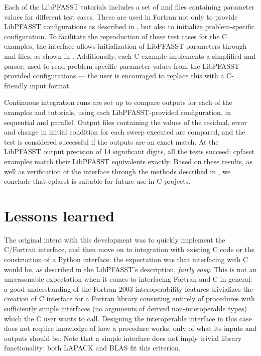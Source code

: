 Each of the LibPFASST tutorials includes a set of nml files containing parameter values for different test cases. These are used in Fortran not only to provide LibPFASST configurations as described in , but also to initialize problem-specific configuration. To facilitate the reproduction of these test cases for the C examples, the interface allows initialization of LibPFASST parameters through nml files, as shown in . Additionally, each C example implements a simplified nml parser, used to read problem-specific parameter values from the LibPFASST-provided configurations --- the user is encouraged to replace this with a C-friendly input format.

Continuous integration runs are set up to compare outputs for each of the examples and tutorials, using each LibPFASST-provided configuration, in sequential and parallel. Output files containing the values of the residual, error and change in initial condition for each sweep executed are compared, and the test is considered successful if the outputs are an exact match. At the LibPFASST output precision of 14 significant digits, all the tests succeed: cpfasst examples match their LibPFASST equivalents exactly. Based on these results, as well as verification of the interface through the methods described in , we conclude that cpfasst is suitable for future use in C projects. 

\section{Lessons learned}

The original intent with this development was to quickly implement the C/Fortran interface, and then move on to integration with existing C code or the construction of a Python interface: the expectation was that interfacing with C would be, as described in the LibPFASST's description, \textit{fairly easy}. This is not an unreasonable expectation when it comes to interfacing Fortran and C in general: a good understanding of the Fortran 2003 interoperability features trivializes the creation of C interface for a Fortran library consisting entirely of procedures with sufficiently simple interfaces (no arguments of derived non-interoperable types) which the C user wants to call. Designing the interoperable interface in this case does not require knowledge of how a procedure works, only of what its inputs and outputs should be. Note that a simple interface does not imply trivial library functionality: both LAPACK and BLAS fit this criterion.

